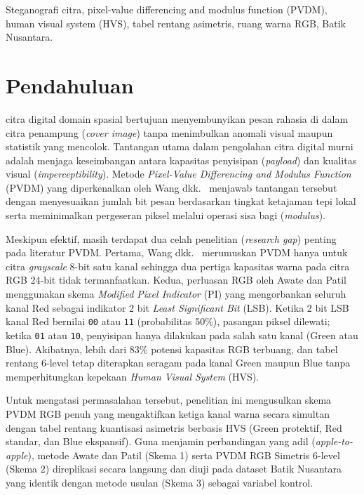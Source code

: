 \documentclass[12pt,journal]{IEEEtran}
\begin{document}
\begin{IEEEkeywords}
Steganografi citra, pixel-value differencing and modulus function (PVDM), human visual system (HVS), tabel rentang asimetris, ruang warna RGB, Batik Nusantara.
\end{IEEEkeywords}

\section{Pendahuluan}

 citra digital domain spasial bertujuan menyembunyikan pesan rahasia di dalam citra penampung (\textit{cover image}) tanpa menimbulkan anomali visual maupun statistik yang mencolok. Tantangan utama dalam pengolahan citra digital murni adalah menjaga keseimbangan antara kapasitas penyisipan (\textit{payload}) dan kualitas visual (\textit{imperceptibility}). Metode \textit{Pixel-Value Differencing and Modulus Function} (PVDM) yang diperkenalkan oleh Wang dkk.~\cite{wang2008high} menjawab tantangan tersebut dengan menyesuaikan jumlah bit pesan berdasarkan tingkat ketajaman tepi lokal serta meminimalkan pergeseran piksel melalui operasi sisa bagi (\textit{modulus}).

Meskipun efektif, masih terdapat dua celah penelitian (\textit{research gap}) penting pada literatur PVDM. Pertama, Wang dkk.~\cite{wang2008high} merumuskan PVDM hanya untuk citra \textit{grayscale} 8-bit satu kanal sehingga dua pertiga kapasitas warna pada citra RGB 24-bit tidak termanfaatkan. Kedua, perluasan RGB oleh Awate dan Patil~\cite{awate2016high} menggunakan skema \textit{Modified Pixel Indicator} (PI) yang mengorbankan seluruh kanal Red sebagai indikator 2 bit \textit{Least Significant Bit} (LSB). Ketika 2 bit LSB kanal Red bernilai \texttt{00} atau \texttt{11} (probabilitas 50\%), pasangan piksel dilewati; ketika \texttt{01} atau \texttt{10}, penyisipan hanya dilakukan pada salah satu kanal (Green atau Blue). Akibatnya, lebih dari 83\% potensi kapasitas RGB terbuang, dan tabel rentang 6-level tetap diterapkan seragam pada kanal Green maupun Blue tanpa memperhitungkan kepekaan \textit{Human Visual System} (HVS).

Untuk mengatasi permasalahan tersebut, penelitian ini mengusulkan skema PVDM RGB penuh yang mengaktifkan ketiga kanal warna secara simultan dengan tabel rentang kuantisasi asimetris berbasis HVS (Green protektif, Red standar, dan Blue ekspansif). Guna menjamin perbandingan yang adil (\textit{apple-to-apple}), metode Awate dan Patil (Skema 1) serta PVDM RGB Simetris 6-level (Skema 2) direplikasi secara langsung dan diuji pada dataset Batik Nusantara yang identik dengan metode usulan (Skema 3) sebagai variabel kontrol.
\end{document}

